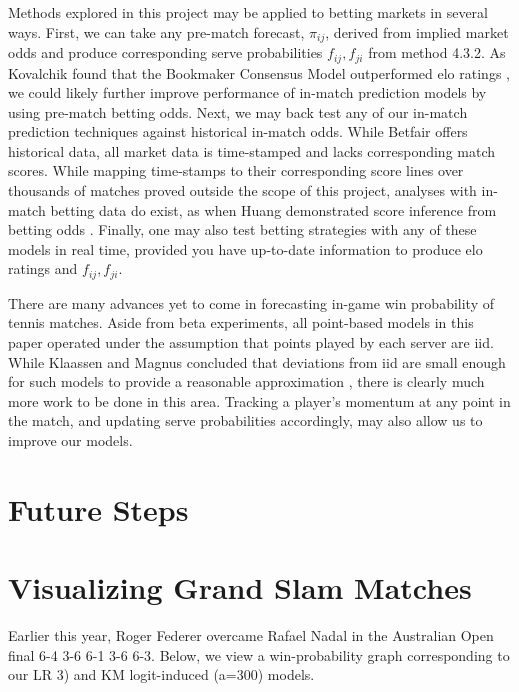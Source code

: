 \documentclass[chapterprefix=false]{report}
\begin{document}
Methods explored in this project may be applied to betting markets in several ways. First, we can take any pre-match forecast, $\pi_{ij}$, derived from implied market odds and produce corresponding serve probabilities $f_{ij},f_{ji}$ from method 4.3.2. As Kovalchik found that the Bookmaker Consensus Model outperformed elo ratings \cite{Kovalchik2016}, we could likely further improve performance of in-match prediction models by using pre-match betting odds. Next, we may back test any of our in-match prediction techniques against historical in-match odds. While Betfair offers historical data, all market data is time-stamped and lacks corresponding match scores. While mapping time-stamps to their corresponding score lines over thousands of matches proved outside the scope of this project, analyses with in-match betting data do exist, as when Huang demonstrated score inference from betting odds \cite{Huang2011}. Finally, one may also test betting strategies with any of these models in real time, provided you have up-to-date information to produce elo ratings and $f_{ij},f_{ji}$.

There are many advances yet to come in forecasting in-game win probability of tennis matches. Aside from beta experiments, all point-based models in this paper operated under the assumption that points played by each server are iid. While Klaassen and Magnus concluded that deviations from iid are small enough for such models to provide a reasonable approximation \cite{KlaassenandMagnus2001}, there is clearly much more work to be done in this area. Tracking a player's momentum at any point in the match, and updating serve probabilities accordingly, may also allow us to improve our models.



\section{Future Steps}

\section{Visualizing Grand Slam Matches}

Earlier this year, Roger Federer overcame Rafael Nadal in the Australian Open final 6-4 3-6 6-1 3-6 6-3. Below, we view a win-probability graph corresponding to our LR 3) and KM logit-induced (a=300) models.
\end{document}
